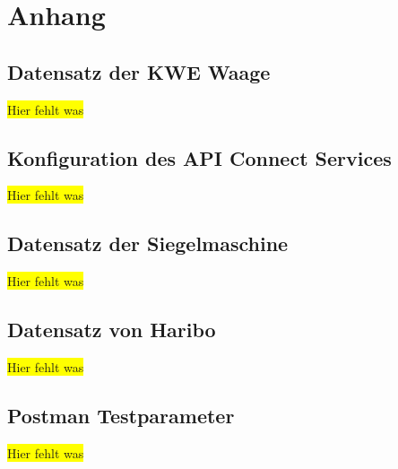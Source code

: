\chapter{Anhang}
\label{ch:anhang}

\section{Datensatz der KWE Waage}
\label{sec:scaleData}
\colorbox{yellow}{Hier fehlt was}

\section{Konfiguration des API Connect Services}
\colorbox{yellow}{Hier fehlt was}

\section{Datensatz der Siegelmaschine}
\label{sec:hariboData}
\colorbox{yellow}{Hier fehlt was}

\section{Datensatz von Haribo}
\label{sec:hariboData}
\colorbox{yellow}{Hier fehlt was}

\section{Postman Testparameter}
\label{sec:postmanTestparameter}
\colorbox{yellow}{Hier fehlt was}